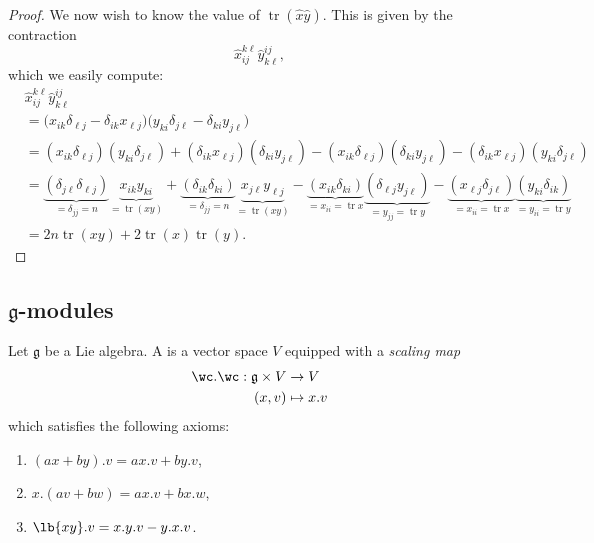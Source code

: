 \documentclass{article}
\DeclarePairedDelimiter\lb\lbrack\rbrack
\DeclareMathOperator{\tr}{tr}
\newcommand*\frkg{{\ensuremath{\mathfrak{g}}}}
\begin{document}
\begin{proof}
    We now wish to know the value of $\tr (\hat{x} \hat{y})$.
    This is given by the contraction
    \[
        \hat{x}_{ij}^{k\ell}\hat{y}_{k\ell}^{ij},
    \]
    which we easily compute:
    \begin{align*}
        &\hat{x}_{ij}^{k\ell}\hat{y}_{k\ell}^{ij}
        \\
        &=
        \Big(
            x_{ik}\delta_{\ell j}
            -
            \delta_{ik}x_{\ell j}
        \Big)
        \Big(
            y_{ki}\delta_{j\ell}
            -
            \delta_{ki}y_{j\ell}
        \Big)
        \\
        &=
        (x_{ik}\delta_{\ell j})(y_{ki}\delta_{j\ell})
        +
        (\delta_{ik}x_{\ell j})(\delta_{ki}y_{j\ell})
        -
        (x_{ik}\delta_{\ell j})(\delta_{ki}y_{j\ell})
        -
        (\delta_{ik}x_{\ell j})(y_{ki}\delta_{j \ell})
        \\
        &=
        \underbrace{
            (\delta_{j\ell}\delta_{\ell j})
        }_{=\delta_{jj}=n}
        \underbrace{
            x_{ik}y_{ki}
        }_{=\tr(xy)}
        +
        \underbrace{
            (\delta_{ik}\delta_{ki})
        }_{=\delta_{jj}=n}
        \underbrace{
            x_{j\ell}y_{\ell j}
        }_{=\tr(xy)}
        -
        \underbrace{
            (x_{ik}\delta_{ki})
        }_{=x_{ii}=\tr x}
        \underbrace{
            (\delta_{\ell j}y_{j\ell})
        }_{=y_{jj}=\tr y}
        -
        \underbrace{
            (x_{\ell j}\delta_{j\ell})
        }_{=x_{ii}=\tr x}
        \underbrace{
            (y_{ki}\delta_{ik})
        }_{=y_{ii}=\tr y}
        \\
        &=
        2n\tr(xy) + 2\tr(x)\tr(y).
    \end{align*}
\end{proof}

\subsection{\texorpdfstring{$\frkg$}{g}-modules}

\begin{definition}
    Let $\frkg$ be a Lie algebra.
    A \defstyle{$\frkg$-module} is a vector space $V$ equipped with a \textit{scaling map}
    \begin{align*}
        \wc . \wc:
        \frkg \times V
        &\to
        V
        \\
        (x, v)
        &\mapsto
        x.v
    \end{align*}
    which satisfies the following axioms:
    \begin{enumerate}[label=(M\arabic*)]
        \item \label{ax:ModuleLeftDistribute}
            $(ax + by).v  = ax.v + by.v$,
        \item \label{ax:ModuleRightDistribute}
            $x.(av + bw) = ax.v + bx.w$,
        \item \label{ax:ModuleBracket}
            $\lb{xy}.v = x.y.v - y.x.v$.
    \end{enumerate}

\end{definition}
\end{document}
